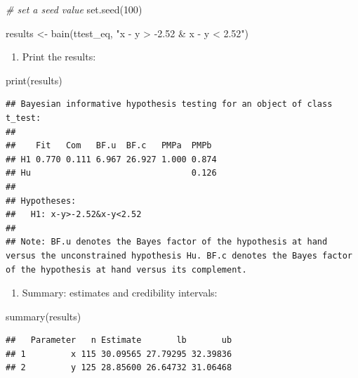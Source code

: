\documentclass[
]{book}
\newenvironment{Shaded}{\begin{snugshade}}{\end{snugshade}}
\newcommand{\CommentTok}[1]{\textcolor[rgb]{0.56,0.35,0.01}{\textit{#1}}}
\newcommand{\DecValTok}[1]{\textcolor[rgb]{0.00,0.00,0.81}{#1}}
\newcommand{\FunctionTok}[1]{\textcolor[rgb]{0.00,0.00,0.00}{#1}}
\newcommand{\NormalTok}[1]{#1}
\newcommand{\OtherTok}[1]{\textcolor[rgb]{0.56,0.35,0.01}{#1}}
\newcommand{\StringTok}[1]{\textcolor[rgb]{0.31,0.60,0.02}{#1}}
\providecommand{\tightlist}{%
  \setlength{\itemsep}{0pt}\setlength{\parskip}{0pt}}
\begin{document}
\begin{Shaded}
\begin{Highlighting}[]
\CommentTok{\# set a seed value}
\FunctionTok{set.seed}\NormalTok{(}\DecValTok{100}\NormalTok{)}

\NormalTok{results }\OtherTok{\textless{}{-}} \FunctionTok{bain}\NormalTok{(ttest\_eq, }\StringTok{"x {-} y \textgreater{} {-}2.52 \& x {-} y \textless{} 2.52"}\NormalTok{)}
\end{Highlighting}
\end{Shaded}

\begin{enumerate}
\def\labelenumi{\arabic{enumi})}
\setcounter{enumi}{2}
\tightlist
\item
  Print the results:
\end{enumerate}

\begin{Shaded}
\begin{Highlighting}[]
\FunctionTok{print}\NormalTok{(results)}
\end{Highlighting}
\end{Shaded}

\begin{verbatim}
## Bayesian informative hypothesis testing for an object of class t_test:
## 
##    Fit   Com   BF.u  BF.c   PMPa  PMPb 
## H1 0.770 0.111 6.967 26.927 1.000 0.874
## Hu                                0.126
## 
## Hypotheses:
##   H1: x-y>-2.52&x-y<2.52
## 
## Note: BF.u denotes the Bayes factor of the hypothesis at hand versus the unconstrained hypothesis Hu. BF.c denotes the Bayes factor of the hypothesis at hand versus its complement.
\end{verbatim}

\begin{enumerate}
\def\labelenumi{\arabic{enumi})}
\setcounter{enumi}{3}
\tightlist
\item
  Summary: estimates and credibility intervals:
\end{enumerate}

\begin{Shaded}
\begin{Highlighting}[]
\FunctionTok{summary}\NormalTok{(results)}
\end{Highlighting}
\end{Shaded}

\begin{verbatim}
##   Parameter   n Estimate       lb       ub
## 1         x 115 30.09565 27.79295 32.39836
## 2         y 125 28.85600 26.64732 31.06468
\end{verbatim}
\end{document}
